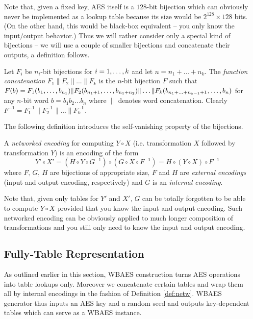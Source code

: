 Note that, given a fixed key, AES itself is a $128$-bit bijection which can obviously never be implemented as a lookup table because its size would be $2^{128}\times 128$ bits. (On the other hand, this would be black-box equivalent -- you only know the input/output behavior.) Thus we will rather consider only a special kind of bijections -- we will use a couple of smaller bijections and concatenate their outputs, a definition follows.

\begin{defn}
\label{def:concat}
	Let $F_i$ be $n_i$-bit bijections for $i=1 , \ldots , k$ and let $n = n_1 + \ldots + n_k$. The {\em function concatenation} $F_1 \| F_2 \| \ldots \| F_k$ is the $n$-bit bijection $F$ such that $F(b) = F_1(b_1 , \ldots , b_{n_1})\| F_2(b_{n_1+1} , \ldots , b_{n_1+n_2})\|\ldots\| F_k(b_{n_1+\ldots+n_{k-1}+1} , \ldots , b_n)$ for any $n$-bit word $b=b_1b_2\ldots b_n$ where $\|$ denotes word concatenation. Clearly $F^{-1} = F_1^{-1}\| F_2^{-1}\| \ldots \|F_k^{-1}$.
\end{defn}

The following definition introduces the self-vanishing property of the bijections.

\begin{defn}
\label{def:netw}
	A {\em networked encoding} for computing $Y\circ X$ (i.e. transformation $X$ followed by transformation $Y$) is an encoding of the form
	\[
		Y'\circ X' = (H\circ Y\circ G^{-1})\circ(G\circ X\circ F^{-1}) = H\circ(Y\circ X)\circ F^{-1}
	\]
	where $F$, $G$, $H$ are bijections of appropriate size, $F$ and $H$ are {\em external encodings} (input and output encoding, respectively) and $G$ is an {\em internal encoding}.
\end{defn}

Note that, given only tables for $Y'$ and $X'$, $G$ can be totally forgotten to be able to compute $Y\circ X$ provided that you know the input and output encoding. Such networked encoding can be obviously applied to much longer composition of transformations and you still only need to know the input and output encoding.   %

\subsection{Fully-Table Representation}

As outlined earlier in this section, WBAES construction turns AES operations into table lookups only. Moreover we concatenate certain tables and wrap them all by internal encodings in the fashion of Definition \ref{def:netw}. WBAES generator thus inputs an AES key and a random seed and outputs key-dependent tables which can serve as a WBAES instance.

